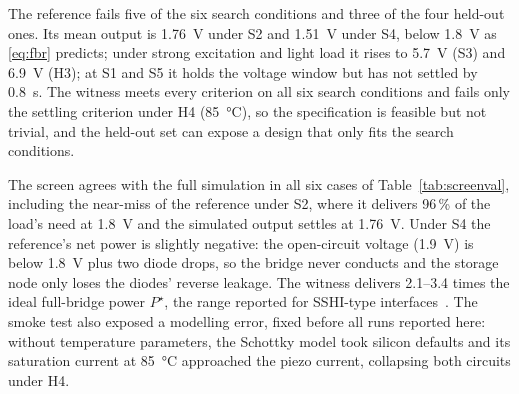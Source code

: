 \documentclass[journal]{IEEEtran}
\begin{document}
The reference fails five of the six search conditions and three of the four held-out ones. Its mean
output is \SI{1.76}{V} under S2 and \SI{1.51}{V} under S4, below \SI{1.8}{V} as \eqref{eq:fbr} predicts;
under strong excitation and light load it rises to \SI{5.7}{V} (S3) and \SI{6.9}{V} (H3); at S1 and S5 it
holds the voltage window but has not settled by \SI{0.8}{s}. The witness meets every criterion on all six
search conditions and fails only the settling criterion under H4 (\SI{85}{\celsius}), so the
specification is feasible but not trivial, and the held-out set can expose a design that only fits the
search conditions.

\begin{table}[t]
\centering\footnotesize
\caption{Reference (FBR) and witness on every condition: mean and peak output and overall verdict.}\label{tab:reference}
\resizebox{\columnwidth}{!}{}
\end{table}

\begin{table}[t]
\centering\footnotesize
\caption{The screen against full simulation. $P_{net}$: net power into the storage node fixed at
\SI{1.8}{V}; need: $V_s^2/R_L$; prediction from \eqref{eq:screen}; simulated $\bar V$: mean output of the
\SI{0.8}{s} cold-start run.}\label{tab:screenval}
\resizebox{\columnwidth}{!}{}
\end{table}

The screen agrees with the full simulation in all six cases of Table~\ref{tab:screenval}, including the
near-miss of the reference under S2, where it delivers 96\,\% of the load's need at \SI{1.8}{V} and the
simulated output settles at \SI{1.76}{V}. Under S4 the reference's net power is slightly negative: the
open-circuit voltage (\SI{1.9}{V}) is below \SI{1.8}{V} plus two diode drops, so the bridge never conducts
and the storage node only loses the diodes' reverse leakage. The witness delivers 2.1--3.4 times the
ideal full-bridge power $P^\star$, the range reported for SSHI-type interfaces~\cite{ramadass2010biasflip}.
The smoke test also exposed a modelling error, fixed before all runs reported here: without temperature
parameters, the Schottky model took silicon defaults and its saturation current at \SI{85}{\celsius}
approached the piezo current, collapsing both circuits under H4.
\end{document}
